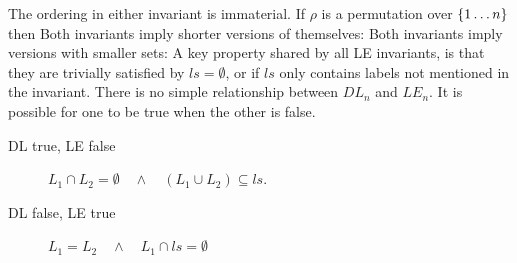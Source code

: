 The ordering in either invariant is immaterial.
If $\rho$ is a permutation over $\{{1\dots n}\}$ then
Both invariants imply shorter versions of themselves:
Both invariants imply versions with smaller sets:
A key property shared by all LE invariants,
is that they are trivially satisfied by $ls = \emptyset$,
or if $ls$ only contains labels not mentioned in the invariant.
There is no simple relationship between $DL_n$ and $LE_n$.
It is possible for one to be true when the other is false.
\begin{description}
  \item[DL true, LE false]
    $L_1 \cap L_2 = \emptyset \quad\land\quad (L_1 \cup L_2) \subseteq ls$.
  \item[DL false, LE true]
    $L_1 = L_2 \quad\land\quad L_1 \cap ls = \emptyset$
\end{description}
